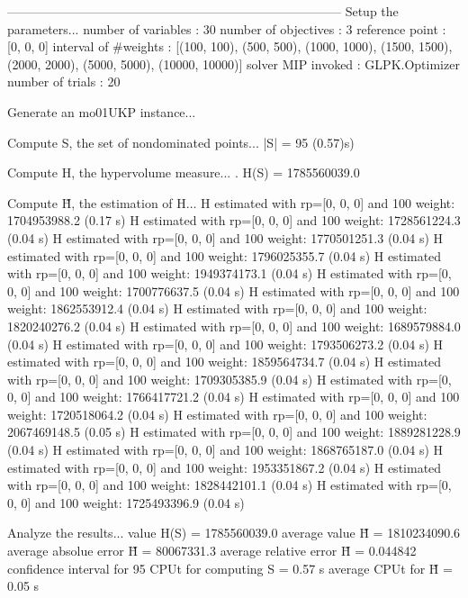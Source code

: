 --------------------------------------------------------------------------------
Setup the parameters...
  number of variables  : 30
  number of objectives : 3
  reference point      : [0, 0, 0]
  interval of #weights : [(100, 100), (500, 500), (1000, 1000), (1500, 1500), (2000, 2000), (5000, 5000), (10000, 10000)]
  solver MIP invoked   : GLPK.Optimizer
  number of trials     : 20

Generate an mo01UKP instance...

Compute S, the set of nondominated points...
  |S|  = 95 (0.57)s)

Compute H, the hypervolume measure...
. H(S) = 1785560039.0

Compute H̃, the estimation of H...
  H estimated with rp=[0, 0, 0] and 100 weight:  1704953988.2  (0.17 s)
  H estimated with rp=[0, 0, 0] and 100 weight:  1728561224.3  (0.04 s)
  H estimated with rp=[0, 0, 0] and 100 weight:  1770501251.3  (0.04 s)
  H estimated with rp=[0, 0, 0] and 100 weight:  1796025355.7  (0.04 s)
  H estimated with rp=[0, 0, 0] and 100 weight:  1949374173.1  (0.04 s)
  H estimated with rp=[0, 0, 0] and 100 weight:  1700776637.5  (0.04 s)
  H estimated with rp=[0, 0, 0] and 100 weight:  1862553912.4  (0.04 s)
  H estimated with rp=[0, 0, 0] and 100 weight:  1820240276.2  (0.04 s)
  H estimated with rp=[0, 0, 0] and 100 weight:  1689579884.0  (0.04 s)
  H estimated with rp=[0, 0, 0] and 100 weight:  1793506273.2  (0.04 s)
  H estimated with rp=[0, 0, 0] and 100 weight:  1859564734.7  (0.04 s)
  H estimated with rp=[0, 0, 0] and 100 weight:  1709305385.9  (0.04 s)
  H estimated with rp=[0, 0, 0] and 100 weight:  1766417721.2  (0.04 s)
  H estimated with rp=[0, 0, 0] and 100 weight:  1720518064.2  (0.04 s)
  H estimated with rp=[0, 0, 0] and 100 weight:  2067469148.5  (0.05 s)
  H estimated with rp=[0, 0, 0] and 100 weight:  1889281228.9  (0.04 s)
  H estimated with rp=[0, 0, 0] and 100 weight:  1868765187.0  (0.04 s)
  H estimated with rp=[0, 0, 0] and 100 weight:  1953351867.2  (0.04 s)
  H estimated with rp=[0, 0, 0] and 100 weight:  1828442101.1  (0.04 s)
  H estimated with rp=[0, 0, 0] and 100 weight:  1725493396.9  (0.04 s)

Analyze the results...
  value H(S)                  = 1785560039.0 
  average value H̃             = 1810234090.6 
  average absolue error H̃     = 80067331.3 
  average relative error H̃    = 0.044842 
  confidence interval for 95%
  CPUt for computing S         = 0.57 s
  average CPUt for H̃           = 0.05 s

